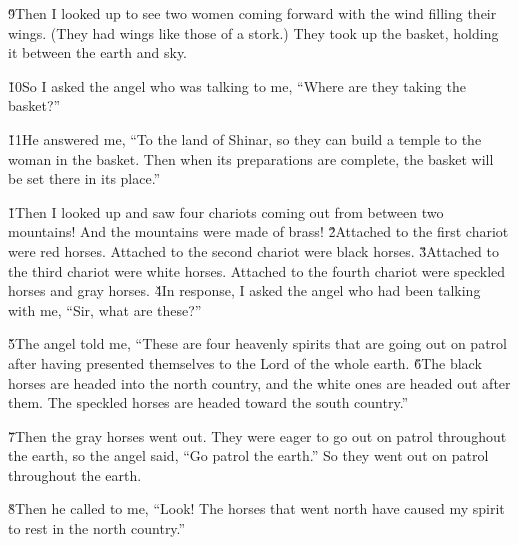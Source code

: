 \v{9}Then I looked up to see two women coming forward with the wind filling their wings. (They had wings like those of a stork.) They took up the basket, holding it between the earth and sky.

\v{10}So I asked the angel who was talking to me, ``Where are they taking the basket?''

\v{11}He answered me, ``To the land of Shinar, so they can build a temple to the woman in the basket. Then when its preparations are complete, the basket will be set there in its place.''

\v{1}Then I looked up and saw four chariots coming out from between two mountains! And the mountains were made of brass! \v{2}Attached to the first chariot were red horses. Attached to the second chariot were black horses. \v{3}Attached to the third chariot were white horses. Attached to the fourth chariot were speckled horses and gray horses. \v{4}In response, I asked the angel who had been talking with me, ``Sir, what are these?''

\v{5}The angel told me, ``These are four heavenly spirits that are going out on patrol after having presented themselves to the Lord of the whole earth. \v{6}The black horses are headed into the north country, and the white ones are headed out after them. The speckled horses are headed toward the south country.''

\v{7}Then the gray horses went out. They were eager to go out on patrol throughout the earth, so the angel said, ``Go patrol the earth.'' So they went out on patrol throughout the earth.

\v{8}Then he called to me, ``Look! The horses that went north have caused my spirit to rest in the north country.''

